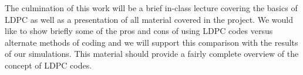 \documentclass[11pt]{article}
\begin{document}
The culmination of this work will be a brief in-class lecture covering the basics of LDPC as well as a presentation of all material covered in the project. We would like to show briefly some of the pros and cons of using LDPC codes versus alternate methods of coding and we will support this comparison with the results of our simulations. This material should provide a fairly complete overview of the concept of LDPC codes.  

\nocite {RichUrbBook,MackayBook,CoverBook,Gallagher1962,Mackay1999,Tenbrink1999,Tenbrink2000,AshiKramTenb2004,BerGlaThi1993}



\end{document}

